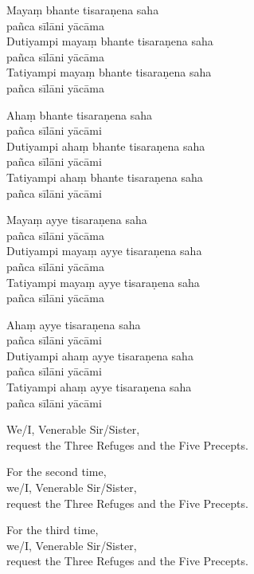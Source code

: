 \ifhandbookedition
\enlargethispage{\baselineskip}
\fi


Mayaṃ bhante tisaraṇena saha\\\vin pañca sīlāni yācāma\\
Dutiyampi mayaṃ bhante tisaraṇena saha\\\vin pañca sīlāni yācāma\\
Tatiyampi mayaṃ bhante tisaraṇena saha\\\vin pañca sīlāni yācāma


Ahaṃ bhante tisaraṇena saha\\\vin pañca sīlāni yācāmi\\
Dutiyampi ahaṃ bhante tisaraṇena saha\\\vin pañca sīlāni yācāmi\\
Tatiyampi ahaṃ bhante tisaraṇena saha\\\vin pañca sīlāni yācāmi


Mayaṃ ayye tisaraṇena saha\\\vin pañca sīlāni yācāma\\
Dutiyampi mayaṃ ayye tisaraṇena saha\\\vin pañca sīlāni yācāma\\
Tatiyampi mayaṃ ayye tisaraṇena saha\\\vin pañca sīlāni yācāma


Ahaṃ ayye tisaraṇena saha\\\vin pañca sīlāni yācāmi\\
Dutiyampi ahaṃ ayye tisaraṇena saha\\\vin pañca sīlāni yācāmi\\
Tatiyampi ahaṃ ayye tisaraṇena saha\\\vin pañca sīlāni yācāmi

\begin{english}
  We/I, Venerable Sir/Sister,\\
  request the Three Refuges and the Five Precepts.

  For the second time,\\
  we/I, Venerable Sir/Sister,\\
  request the Three Refuges and the Five Precepts.

  For the third time,\\
  we/I, Venerable Sir/Sister,\\
  request the Three Refuges and the Five Precepts.
\end{english}

